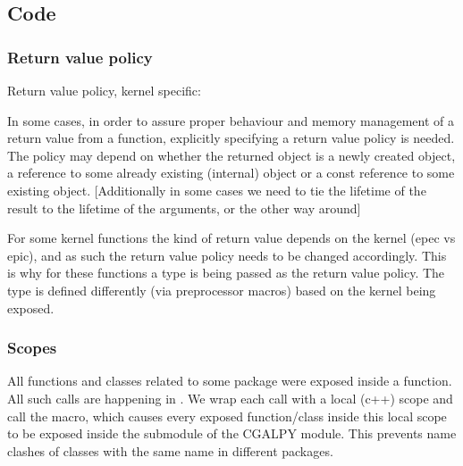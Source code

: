 \begin{table}[!htp]
  \centering{}
 \caption{Spatial Searching Arguments}
 \label{tab:ss}
\end{table}

\subsection{Code}
\label{sec:bind:code}

\subsubsection{Return value policy}
\label{sec:bind:code:rvp}
Return value policy, kernel specific:

In some cases, in order to assure proper behaviour and memory
management of a return value from a function, explicitly specifying a
return value policy is needed. The policy may depend on whether the
returned object is a newly created object, a reference to some already
existing (internal) object or a const reference to some existing
object. [Additionally in some cases we need to tie the lifetime of the
result to the lifetime of the arguments, or the other way around]

For some kernel functions the kind of return value depends on the
kernel (epec vs epic), and as such the return value policy needs to be
changed accordingly. This is why for these functions a
 type is being passed as the
return value policy. The type is defined differently (via preprocessor
macros) based on the kernel being exposed.

\subsubsection{Scopes}
\label{sec:bind:code:scopes}
All functions and classes related to some package were exposed inside
a  function. All such calls are
happening in . We wrap each call with a
local (c++) scope and call the 
macro, which causes every exposed function/class inside this local
scope to be exposed inside the  submodule of
the CGALPY module. This prevents name clashes of classes with the same
name in different packages.


